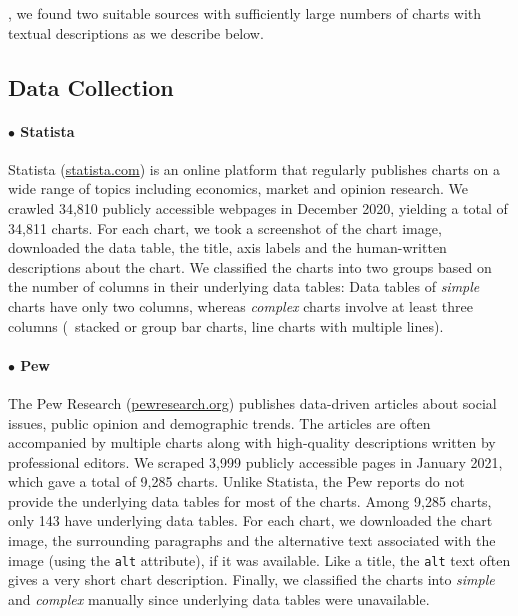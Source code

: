 
, we found two suitable sources with sufficiently large numbers  of charts with textual descriptions as we describe below.



\subsection{Data Collection}

\paragraph{$\bullet$ Statista} Statista ({\href{https://www.statista.com}{statista.com}}) is an online platform that regularly publishes charts on a wide range of topics including economics, market and opinion research. 
We crawled 34,810 publicly accessible webpages in December 2020, yielding a total of 34,811 charts. 
For each chart, we took a screenshot of the chart image, downloaded the data table, the title, axis labels and the human-written 
descriptions about the chart. We classified the charts into two groups based on the number of columns in their underlying data tables: Data tables of \emph{simple} charts  have only two columns, whereas \emph{complex} charts involve at least three columns (\eg\ stacked or group bar charts, line charts with multiple lines).



\paragraph{$\bullet$ Pew} The Pew Research ({\href{https://www.pewresearch.org}{pewresearch.org}}) publishes data-driven articles about social issues, public opinion and demographic trends. The articles are often accompanied by multiple charts along with high-quality descriptions written by professional editors. We scraped 3,999 publicly accessible pages in January 2021, which gave a total of 9,285 charts. Unlike Statista, the Pew reports 
do not provide the underlying data tables for most of the charts. Among 9,285 charts, only 143 have 
underlying data tables. For each chart, we downloaded the chart image, the surrounding paragraphs and the alternative text associated with the image (using the \texttt{alt} attribute), if it was available. Like a title, the \texttt{alt} text often gives a very short chart description. Finally, we classified the charts into \emph{simple} and \emph{complex} manually since 
underlying data tables were unavailable. 

